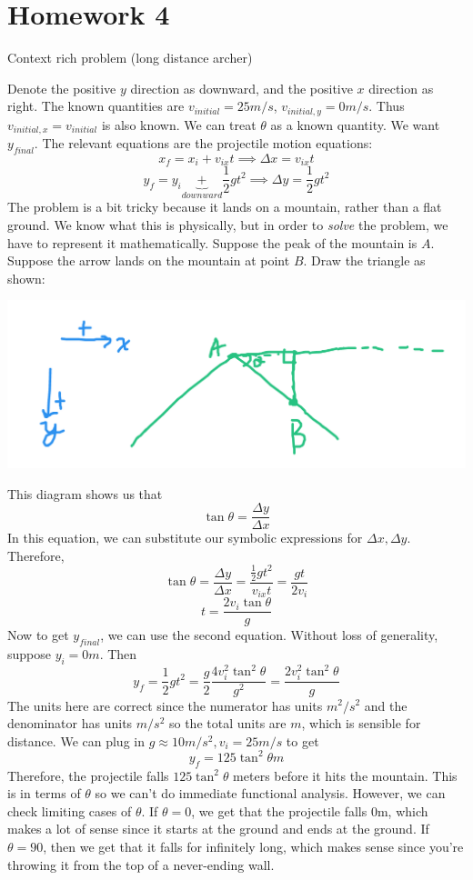 \documentclass[11pt]{scrartcl}
\begin{document}
\section{Homework 4}
\begin{example}
  Context rich problem (long distance archer)
\end{example}
\begin{soln}
  Denote the positive $y$ direction as downward, and the positive $x$ direction as right.
  The known quantities are $v_{initial}=25m/s$, $v_{initial, y}=0m/s$. Thus $v_{initial, x}=v_{initial}$ is also known.
  We can treat $\theta$ as a known quantity. We want $y_{final}$. The
  relevant equations are the projectile motion equations:
  $$x_f=x_i+v_{ix}t\implies \Delta x=v_{ix} t$$
  $$y_f=y_i\underbrace{+}_{downward}\frac{1}{2}gt^2\implies \Delta y=\frac{1}{2}gt^2$$
  The problem is a bit tricky because it lands on a mountain,
  rather than a flat ground. We know what this is physically,
  but in order to \textit{solve} the problem, we have to represent
  it mathematically. Suppose the peak of the mountain is $A$.
  Suppose the arrow lands on the mountain at point $B$. Draw the triangle as shown:
  \begin{center}\includegraphics[scale=0.3]{projectile.png}\end{center}
  This diagram shows us that
  $$\tan\theta=\frac{\Delta y}{\Delta x}$$
  In this equation, we can substitute our symbolic expressions for $\Delta x,\Delta y$.
  Therefore,
  $$\tan\theta=\frac{\Delta y}{\Delta x}=\frac{\frac{1}{2}gt^2}{v_{ix}t}=\frac{gt}{2v_i}$$
  $$t=\frac{2v_i\tan\theta}{g}$$
  Now to get $y_{final}$, we can use the second equation. Without loss of generality, suppose $y_i=0 m$. Then
  $$y_f=\frac{1}{2}gt^2=\frac{g}{2}\frac{4v_i^2\tan^2\theta}{g^2}=\frac{2v_i^2\tan^2\theta}{g}$$
  The units here are correct since the numerator has units $m^2/s^2$ and the denominator has units $m/s^2$  so the total units are $m$,
  which is sensible for distance. We can plug in $g\approx 10m/s^2, v_i=25m/s$ to get
  $$y_f=125\tan^2\theta m$$
  Therefore, the projectile falls $125\tan^2\theta$ meters before it hits the mountain. This is in terms of $\theta$
  so we can't do immediate functional analysis. However, we can check limiting cases of $\theta$. If $\theta=0$,
  we get that the projectile falls $0$m, which makes a lot of sense since it starts at the ground and ends at the ground.
  If $\theta=90$, then we get that it falls for infinitely long, which makes sense since you're throwing it from the top of a
  never-ending wall.
\end{soln}
\end{document}
